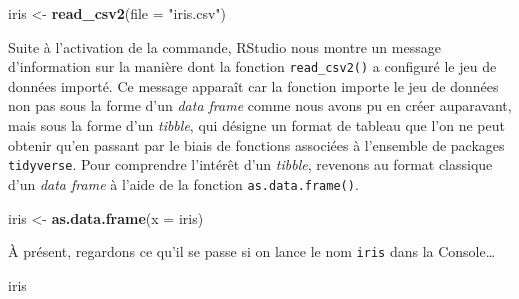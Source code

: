 \documentclass[
  french,
]{book}
\newenvironment{Shaded}{\begin{snugshade}}{\end{snugshade}}
\newcommand{\DataTypeTok}[1]{\textcolor[rgb]{0.13,0.29,0.53}{#1}}
\newcommand{\KeywordTok}[1]{\textcolor[rgb]{0.13,0.29,0.53}{\textbf{#1}}}
\newcommand{\NormalTok}[1]{#1}
\newcommand{\StringTok}[1]{\textcolor[rgb]{0.31,0.60,0.02}{#1}}
\begin{document}
\begin{Shaded}
\begin{Highlighting}[]
\NormalTok{iris <-}\StringTok{ }\KeywordTok{read_csv2}\NormalTok{(}\DataTypeTok{file =} \StringTok{"iris.csv"}\NormalTok{)}
\end{Highlighting}
\end{Shaded}

Suite à l'activation de la commande, RStudio nous montre un message d'information sur la manière dont la fonction \texttt{read\_csv2()} a configuré le jeu de données importé. Ce message apparaît car la fonction importe le jeu de données non pas sous la forme d'un \emph{data frame} comme nous avons pu en créer auparavant, mais sous la forme d'un \emph{tibble}, qui désigne un format de tableau que l'on ne peut obtenir qu'en passant par le biais de fonctions associées à l'ensemble de packages \texttt{tidyverse}. Pour comprendre l'intérêt d'un \emph{tibble}, revenons au format classique d'un \emph{data frame} à l'aide de la fonction \texttt{as.data.frame()}.

\begin{Shaded}
\begin{Highlighting}[]
\NormalTok{iris <-}\StringTok{ }\KeywordTok{as.data.frame}\NormalTok{(}\DataTypeTok{x =}\NormalTok{ iris)}
\end{Highlighting}
\end{Shaded}

À présent, regardons ce qu'il se passe si on lance le nom \texttt{iris} dans la Console\ldots{}

\begin{Shaded}
\begin{Highlighting}[]
\NormalTok{iris}
\end{Highlighting}
\end{Shaded}
\end{document}
